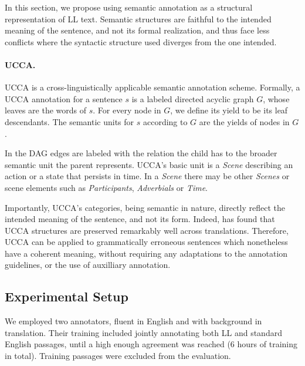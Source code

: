 		In this section, we propose using semantic annotation as a structural
		representation of LL text. Semantic structures are faithful to the intended
		meaning of the sentence, and not its formal realization, and thus face
		less conflicts where the syntactic structure used diverges from
		the one intended.
		
		
		\paragraph{UCCA.}\label{sec:ucca}
		
		UCCA is a cross-linguistically applicable semantic annotation scheme. Formally, 
		a UCCA annotation for a sentence $s$ is a labeled directed acyclic graph $G$, whose
		leaves are the words of $s$. For every node in $G$,
		we define its yield to be its leaf descendants. The
		semantic units for $s$ according to $G$ are the yields
		of nodes in $G$.
		
		In the DAG edges are labeled with the relation the child has to the broader semantic unit
		the parent represents. UCCA's basic unit is a \textit{Scene} describing an action or a state
		that persists in time. In a \textit{Scene} there may be other \textit{Scenes} or scene elements
		such as \textit{Participants}, \textit{Adverbials} or \textit{Time}.
		
		Importantly, UCCA's categories, being semantic in nature, directly reflect the intended
		meaning of the sentence, and not its form. Indeed,  has found
		that UCCA structures are preserved remarkably well across translations.
		Therefore, UCCA can be applied to grammatically erroneous
		sentences which nonetheless have a coherent meaning, without requiring any adaptations
		to the annotation guidelines, or the use of auxilliary annotation.
		
		
		\subsection{Experimental Setup}
		
		We employed two annotators, fluent in English and with background in translation.
		Their training included jointly annotating both LL and standard English
		passages, until a high enough agreement was reached (6 hours of training in total).
		Training passages were excluded from the evaluation.
		
